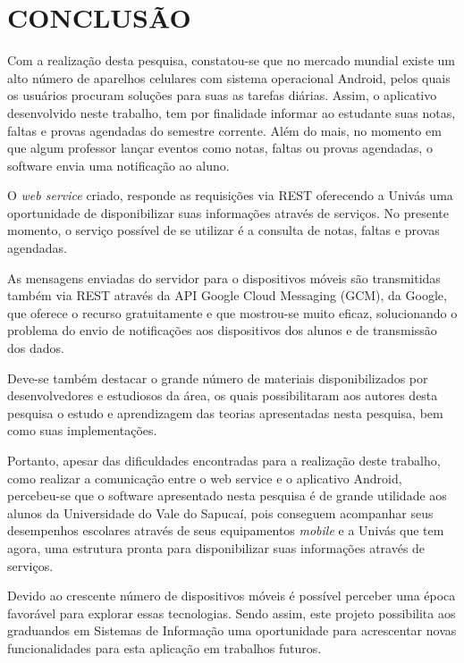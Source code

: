 
\chapter{CONCLUSÃO} 

	\par Com a realização desta pesquisa, constatou-se que no mercado mundial
existe um alto número de aparelhos celulares com sistema operacional Android,
pelos quais os usuários procuram soluções para suas as tarefas diárias. Assim, o
aplicativo desenvolvido neste trabalho, tem por finalidade informar ao
estudante suas notas, faltas e provas agendadas do semestre corrente. Além do
mais, no momento em que algum professor lançar eventos como notas, faltas ou
provas agendadas, o software envia uma notificação ao aluno.

	\par O \textit{web service} criado, responde as requisições via REST oferecendo
a Univás uma oportunidade de disponibilizar suas informações através de
serviços. No presente momento, o serviço possível de se utilizar é a consulta
de notas, faltas e provas agendadas.

	\par As mensagens enviadas do servidor para o dispositivos móveis são
transmitidas também via REST através da API Google Cloud Messaging (GCM), da
Google, que oferece o recurso gratuitamente e que mostrou-se muito eficaz,
solucionando o problema do envio de notificações aos dispositivos dos alunos  e
de transmissão dos dados.

	\par Deve-se também destacar o grande número de materiais disponibilizados por
desenvolvedores e estudiosos da área, os quais possibilitaram aos autores desta
pesquisa o estudo e aprendizagem das teorias apresentadas nesta pesquisa, bem
como suas implementações.

	\par Portanto, apesar das dificuldades encontradas para a realização deste
trabalho, como realizar a comunicação entre o web service e o aplicativo
Android, percebeu-se que o software apresentado nesta pesquisa é de grande
utilidade aos alunos da Universidade do Vale do Sapucaí, pois conseguem
acompanhar seus desempenhos escolares através de seus equipamentos
\textit{mobile} e a Univás que tem agora, uma estrutura pronta para
disponibilizar suas informações através de serviços.

	\par Devido ao crescente número de dispositivos móveis é possível perceber uma
época favorável para explorar essas tecnologias. Sendo assim, este projeto
possibilita aos graduandos em Sistemas de Informação uma oportunidade para
acrescentar novas funcionalidades para esta aplicação em trabalhos futuros.

